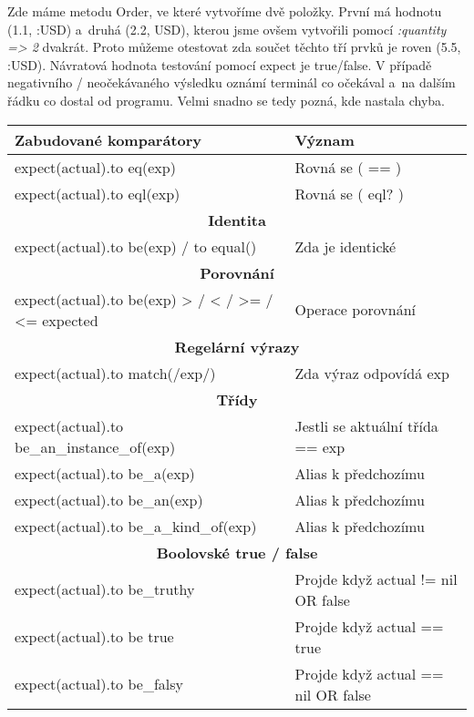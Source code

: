 \par Zde máme metodu Order, ve které vytvoříme dvě položky. První má hodnotu (1.1, :USD) a~druhá (2.2, USD), kterou jsme ovšem vytvořili pomocí \textit{:quantity => 2} dvakrát. Proto můžeme otestovat zda součet těchto tří prvků je roven (5.5, :USD). Návratová hodnota testování pomocí expect je true/false. V případě negativního / neočekávaného výsledku oznámí terminál co očekával a~na dalším řádku co dostal od programu. Velmi snadno se tedy pozná, kde nastala chyba.

\begin{center}
\begin{longtable}{| m{} | m{} |} 
\hline
 \textbf{Zabudované komparátory} & \textbf{Význam} \\ 
 \hline
 expect(actual).to eq(exp) & Rovná se ( == ) \\
 \hline
 expect(actual).to eql(exp) & Rovná se ( eql? ) \\
 \hline
 \multicolumn{2}{||c||}{\textbf{Identita}}\\
 \hline
 expect(actual).to be(exp) / to equal() & Zda je identické\\
 \hline
 \multicolumn{2}{||c||}{\textbf{Porovnání}}\\
 \hline
 expect(actual).to be(exp) > / < / >= / <= expected & Operace porovnání \\
 \hline
 \multicolumn{2}{||c||}{\textbf{Regelární výrazy}}\\
 \hline
 expect(actual).to match(/exp/) & Zda výraz odpovídá exp \\
 \hline
 \multicolumn{2}{||c||}{\textbf{Třídy}}\\
 \hline
 expect(actual).to be\_an\_instance\_of(exp) & Jestli se aktuální třída == exp \\
 \hline
 expect(actual).to be\_a(exp) & Alias k předchozímu \\
 \hline
 expect(actual).to be\_an(exp) & Alias k předchozímu  \\
 \hline
 expect(actual).to be\_a\_kind\_of(exp) & Alias k předchozímu  \\
 \hline
 \multicolumn{2}{||c||}{\textbf{Boolovské true / false}}\\
 \hline
 expect(actual).to be\_truthy  & Projde když actual != nil OR false\\
 \hline
 expect(actual).to be true    & Projde když actual == true \\
 \hline
 expect(actual).to be\_falsy   & Projde když actual == nil OR false \\

\end{longtable}
\end{center}
